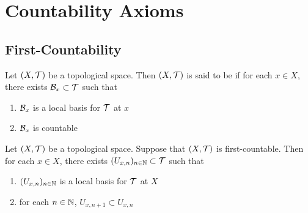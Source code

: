 \documentclass{book}
\begin{document}
	
	
	
	
	
	
	
	
	
	
	
	
	
	
	
	
	
	\newpage
	\section{Countability Axioms}
	
	\subsection{First-Countability}
	
	\begin{defn}
		Let $(X, \mathcal{T})$ be a topological space. Then $(X, \mathcal{T})$ is said to be  if for each $x \in X$, there exists $\mathcal{B}_x \subset \mathcal{T}$ such that 
		\begin{enumerate}
			\item $\mathcal{B}_x$ is a local basis for $\mathcal{T}$ at $x$
			\item $\mathcal{B}_x$ is countable
		\end{enumerate}
	\end{defn}

	\begin{ex}
		Let $(X, \mathcal{T})$ be a topological space. Suppose that $(X, \mathcal{T})$ is first-countable. Then for each $x \in X$, there exists $(U_{x, n})_{n \in \mathbb{N}} \subset \mathcal{T}$ such that 
		\begin{enumerate}
			\item $(U_{x, n})_{n \in \mathbb{N}}$ is a local basis for $\mathcal{T}$ at $X$
			\item for each $n \in \mathbb{N}$, $U_{x, n+1} \subset U_{x, n}$
		\end{enumerate}
	\end{ex}
\end{document}
